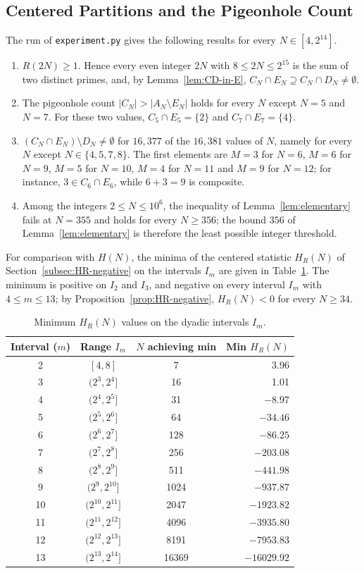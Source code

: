 \documentclass[11pt]{amsart}
\theoremstyle{definition}
\theoremstyle{remark}
\begin{document}
\subsection{Centered Partitions and the Pigeonhole Count}\label{subsec:centered-data}
The run of \texttt{experiment.py} gives the following results for every $N\in[4,2^{14}]$.
\begin{enumerate}
\item[\emph{(1)}] $R(2N)\geq 1$. Hence every even integer $2N$ with $8\leq 2N\leq 2^{15}$ is the sum of two distinct primes, and, by Lemma~\ref{lem:CD-in-E}, $C_N\cap E_N\supseteq C_N\cap D_N\neq\emptyset$.
\item[\emph{(2)}] The pigeonhole count $|C_N|>|A_N\setminus E_N|$ holds for every $N$ except $N=5$ and $N=7$. For these two values, $C_5\cap E_5=\{2\}$ and $C_7\cap E_7=\{4\}$.
\item[\emph{(3)}] $(C_N\cap E_N)\setminus D_N\neq\emptyset$ for $16{,}377$ of the $16{,}381$ values of $N$, namely for every $N$ except $N\in\{4,5,7,8\}$. The first elements are $M=3$ for $N=6$, $M=6$ for $N=9$, $M=5$ for $N=10$, $M=4$ for $N=11$ and $M=9$ for $N=12$; for instance, $3\in C_6\cap E_6$, while $6+3=9$ is composite.
\item[\emph{(4)}] Among the integers $2\leq N\leq 10^6$, the inequality of Lemma~\ref{lem:elementary} fails at $N=355$ and holds for every $N\geq 356$; the bound $356$ of Lemma~\ref{lem:elementary} is therefore the least possible integer threshold.
\end{enumerate}
For comparison with $H(N)$, the minima of the centered statistic $H_R(N)$ of Section~\ref{subsec:HR-negative} on the intervals $I_m$ are given in Table~\ref{tab:centered}. The minimum is positive on $I_2$ and $I_3$, and negative on every interval $I_m$ with $4\leq m\leq 13$; by Proposition~\ref{prop:HR-negative}, $H_R(N)<0$ for every $N\geq 34$.
\begin{table}[H]
\caption{Minimum $H_R(N)$ values on the dyadic intervals $I_m$.}
\label{tab:centered}
\small
\begin{tabularx}{\textwidth}{cccr}
\hline
\textbf{Interval ($m$)} & \textbf{Range $I_m$} & \textbf{$N$ achieving min} & \textbf{Min $H_R(N)$} \\
\hline
2 & $[4,8]$ & 7 & 3.96 \\
3 & $(2^{3},2^{4}]$ & 16 & 1.01 \\
4 & $(2^{4},2^{5}]$ & 31 & $-8.97$ \\
5 & $(2^{5},2^{6}]$ & 64 & $-34.46$ \\
6 & $(2^{6},2^{7}]$ & 128 & $-86.25$ \\
7 & $(2^{7},2^{8}]$ & 256 & $-203.08$ \\
8 & $(2^{8},2^{9}]$ & 511 & $-441.98$ \\
9 & $(2^{9},2^{10}]$ & 1024 & $-937.87$ \\
10 & $(2^{10},2^{11}]$ & 2047 & $-1923.82$ \\
11 & $(2^{11},2^{12}]$ & 4096 & $-3935.80$ \\
12 & $(2^{12},2^{13}]$ & 8191 & $-7953.83$ \\
13 & $(2^{13},2^{14}]$ & 16369 & $-16029.92$ \\
\hline
\end{tabularx}
\end{table}
\end{document}
